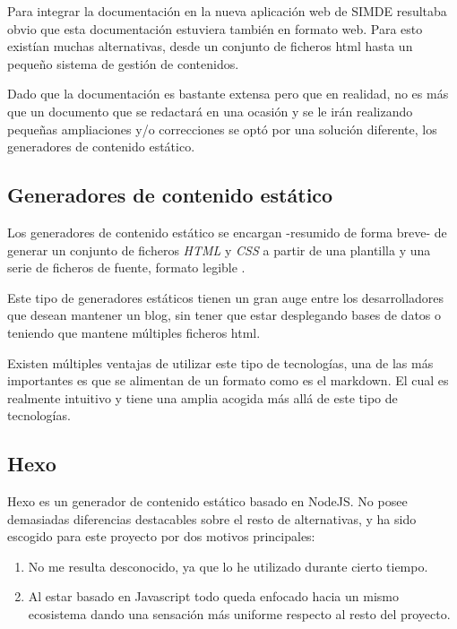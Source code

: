 Para integrar la documentación en la nueva aplicación web de SIMDE resultaba obvio que esta documentación
estuviera también en formato web. Para esto existían muchas alternativas, desde un conjunto de ficheros
html hasta un pequeño sistema de gestión de contenidos. 

\bigskip
Dado que la documentación es bastante extensa pero que en realidad, no es más que un documento 
que se redactará en una ocasión y se le irán realizando pequeñas ampliaciones y/o correcciones
se optó por una solución diferente, los generadores de contenido estático.

\subsection{Generadores de contenido estático}

Los generadores de contenido estático se encargan -resumido de forma breve- de generar 
un conjunto de ficheros \textit{HTML} y \textit{CSS} a partir de una plantilla y una serie 
de ficheros de fuente, formato legible . \cite{GeneradoresEstaticos}

\bigskip
Este tipo de generadores estáticos tienen un gran auge entre los desarrolladores que desean 
mantener un blog, sin tener que estar desplegando bases de datos o teniendo que mantene múltiples
ficheros html. 

\bigskip 
Existen múltiples ventajas de utilizar este tipo de tecnologías, una de las más importantes
 es que se alimentan de un formato como es el markdown. El cual es realmente intuitivo 
 y tiene una amplia acogida más allá de este tipo de tecnologías. 

\subsection{Hexo}

Hexo es un generador de contenido estático basado en NodeJS. \cite{Hexo} No posee demasiadas diferencias destacables
sobre el resto de alternativas, y ha sido escogido para este proyecto por dos motivos principales: 

\begin{enumerate}

\item No me resulta desconocido, ya que lo he utilizado durante cierto tiempo.

\item Al estar basado en Javascript todo queda enfocado hacia un mismo ecosistema dando una sensación
más uniforme respecto al resto del proyecto.

\end{enumerate}